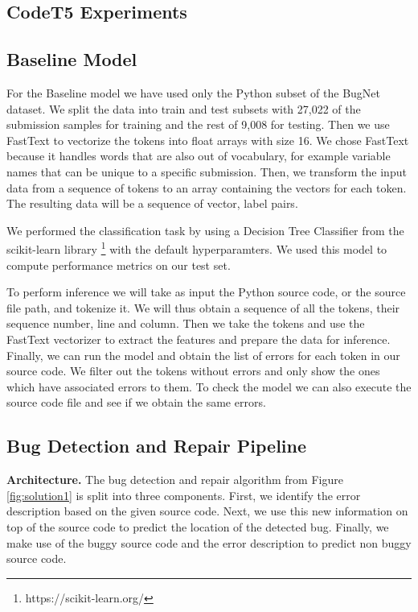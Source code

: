 \documentclass[12pt,a4paper]{report}
\begin{document}


\begin{appendices}

\chapter{CodeT5 Experiments}

\section{Baseline Model}

For the Baseline model we have used only the Python subset of the BugNet dataset. We split the data into train and test subsets with 27,022 of the submission samples for training and the rest of 9,008 for testing. Then we use FastText to vectorize the tokens into float arrays with size 16. We chose FastText because it handles words that are also out of vocabulary, for example variable names that can be unique to a specific submission. Then, we transform the input data from a sequence of tokens to an array containing the vectors for each token. The resulting data will be a sequence of vector, label pairs.

We performed the classification task by using a Decision Tree Classifier from the scikit-learn library \footnote{https://scikit-learn.org/} with the default hyperparamters. We used this model to compute performance metrics on our test set. 

To perform inference we will take as input the Python source code, or the source file path, and tokenize it. We will thus obtain a sequence of all the tokens, their sequence number, line and column. Then we take the tokens and use the FastText vectorizer to extract the features and prepare the data for inference. Finally, we can run the model and obtain the list of errors for each token in our source code. We filter out the tokens without errors and only show the ones which have associated errors to them. To check the model we can also execute the source code file and see if we obtain the same errors.

\section{Bug Detection and Repair Pipeline}

\textbf{Architecture.} The bug detection and repair algorithm from Figure \ref{fig:solution1} is split into three components. First, we identify the error description based on the given source code. Next, we use this new information on top of the source code to predict the location of the detected bug. Finally, we make use of the buggy source code and the error description to predict non buggy source code.


\end{appendices}
\end{document}

